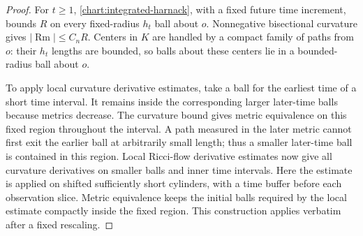 \documentclass[11pt]{article}
\theoremstyle{definition}
\theoremstyle{remark}
\DeclareMathOperator{\Rm}{Rm}
\numberwithin{equation}{section}
\begin{document}
\begin{proof}
For $t\ge1$, \eqref{chart:integrated-harnack}, with a fixed future
time increment, bounds $R$ on every fixed-radius $h_t$ ball about
$o$.  Nonnegative bisectional curvature gives $|\Rm|\le C_nR$.
Centers in $K$ are handled by a compact family of paths from $o$:
their $h_t$ lengths are bounded, so balls about these centers lie
in a bounded-radius ball about $o$.

To apply local curvature derivative estimates, take a ball for the
earliest time of a short time interval.  It remains inside the
corresponding larger later-time balls because metrics decrease.
The curvature bound gives metric equivalence on this fixed region
throughout the interval.  A path measured in the later metric
cannot first exit the earlier ball at arbitrarily small length;
thus a smaller later-time ball is contained in this region.
Local Ricci-flow derivative estimates
\cite{Shi}\cite[Theorem~1.4]{Kotschwar} now give all curvature
derivatives on smaller balls and inner time intervals.
Here the estimate is applied on shifted sufficiently short cylinders,
with a time buffer before each observation slice.  Metric equivalence
keeps the initial balls required by the local estimate compactly
inside the fixed region.  This construction applies verbatim after
a fixed rescaling.


\end{proof}
\end{document}
